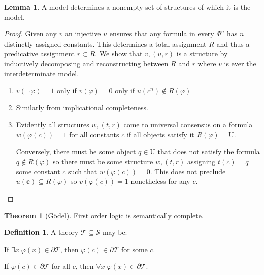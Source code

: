 \documentclass{amsbook}
\newcommand{\univ}[1]{\mathord\forall#1\;}
\newcommand{\exis}[1]{\mathord\exists#1\;}
\theoremstyle{definition}
\newtheorem{thm}{Theorem}[section]
\newtheorem{lmm}{Lemma}[section]
\newtheorem{dfn}{Definition}[section]
\begin{document}
\begin{lmm}
    A model determines a nonempty set of structures of which it is the model.

    \begin{proof}
        Given any $v$ an injective $u$ ensures that any formula in every $\Phi^n$ has $n$ distinctly assigned constants. This determines a total assignment $R$ and thus a predicative assignment $r \subset R$. We show that $v, (u, r)$ is a structure by inductively decomposing and reconstructing between $R$ and $r$ where $v$ is ever the interdeterminate model.
        \begin{enumerate}
            \item $v(\neg\varphi) = 1$ only if $v(\varphi) = 0$ only if $u(c^n) \notin R(\varphi)$
            \item Similarly from implicational completeness.
            \item Evidently all structures $w, (t, r)$ come to universal consensus on a formula $w(\varphi(c)) = 1$ for all constants $c$ if all objects satisfy it $R(\varphi) = \mathrm U$.

                  Conversely, there must be some object $q \in \mathrm U$ that does not satisfy the formula $q \notin R(\varphi)$ so there must be some structure $w, (t, r)$ assigning $t(c) = q$ some constant $c$ such that $w(\varphi(c)) = 0$. This does not preclude $u(\mathbf c) \subseteq R(\varphi)$ so $v(\varphi(c)) = 1$ nonetheless for any $c$.
        \end{enumerate}
    \end{proof}
\end{lmm}

\begin{thm}[G\"odel]
    First order logic is semantically complete.
\end{thm}

\begin{dfn}
    A theory $\mathcal T \subseteq \mathcal S$ may be:
    \begin{description}[
            labelindent=\parindent,
            before={
                    \renewcommand\makelabel[1]{(##1).}
                }
        ]
        \item[$\omega$-consistent] If $\exis x \varphi(x) \in \partial\mathcal T$, then $\varphi(c) \in \partial\mathcal T$ for some $c$.
        \item[$\omega$-complete] If $\varphi(c) \in \partial\mathcal T$ for all $c$, then $\univ x \varphi(x) \in \partial\mathcal T$.
    \end{description}

\end{dfn}
\end{document}
